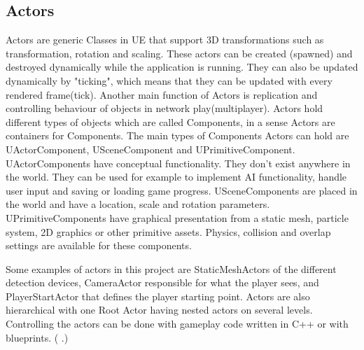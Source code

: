 \documentclass[12pt, a4paper,oneside, nocenter]{thesis}
\newcommand{\citeyeartitlexamk}[1]{(\usebibentry{#1}{title} \citeyear{#1}.)}
\begin{document}
\subsection{Actors}
Actors are generic Classes in UE that support 3D transformations such as transformation, rotation and scaling. These actors can be created (spawned) and destroyed dynamically while the application is running. They can also be updated dynamically by "ticking", which means that they can be updated with every rendered frame(tick). Another main function of Actors is replication and controlling behaviour of objects in network play(multiplayer). Actors hold different types of objects which are called Components, in a sense Actors are containers for Components. The main types of Components Actors can hold are UActorComponent, USceneComponent and UPrimitiveComponent. UActorComponents have conceptual functionality. They don't exist anywhere in the world. They can be used for example to implement AI functionality, handle user input and saving or loading game progress. USceneComponents are placed in the world and have a location, scale and rotation parameters. UPrimitiveComponents have graphical presentation from a static mesh, particle system, 2D graphics or other primitive assets. Physics, collision and overlap settings are available for these components.  
\par
Some examples of actors in this project are StaticMeshActors of the different detection devices, CameraActor responsible for what the player sees, and PlayerStartActor that defines the player starting point. Actors are also hierarchical with one Root Actor having nested actors on several levels. Controlling the actors can be done with gameplay code written in C++ or with blueprints. \citeyeartitlexamk{ue-actors}
\end{document}
